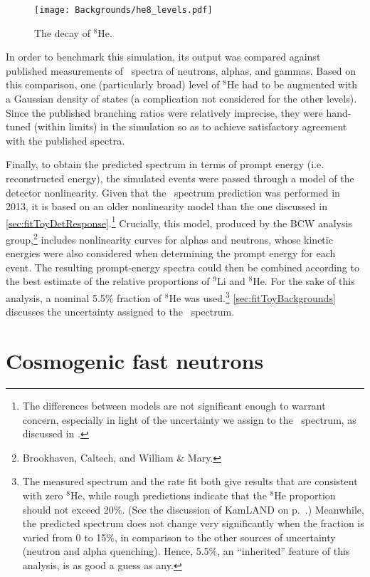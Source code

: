 \documentclass[../thesis.tex]{subfiles}
\begin{document}
\begin{figure}[h]
  \texttt{[image: Backgrounds/he8\_levels.pdf]}
  \caption{The decay of $^8$He.}
  \label{fig:he8_levels}
\end{figure}

In order to benchmark this simulation, its output was compared against published measurements of \LiHe\ spectra of neutrons, alphas, and gammas. Based on this comparison, one (particularly broad) level of $^8$He had to be augmented with a Gaussian density of states (a complication not considered for the other levels). Since the published branching ratios were relatively imprecise, they were hand-tuned (within limits) in the simulation so as to achieve satisfactory agreement with the published spectra.

Finally, to obtain the predicted spectrum in terms of prompt energy (i.e. reconstructed energy), the simulated events were passed through a model of the detector nonlinearity. Given that the \LiHe\ spectrum prediction was performed in 2013, it is based on an older nonlinearity model than the one discussed in \autoref{sec:fitToyDetResponse}.\footnote{The differences between models are not significant enough to warrant concern, especially in light of the uncertainty we assign to the \LiHe\ spectrum, as discussed in \cite{berkeley_toymc}.} Crucially, this model, produced by the BCW analysis group,\footnote{Brookhaven, Caltech, and William \& Mary.} includes nonlinearity curves for alphas and neutrons, whose kinetic energies were also considered when determining the prompt energy for each event. The resulting prompt-energy spectra could then be combined according to the best estimate of the relative proportions of $^9$Li and $^8$He. For the sake of this analysis, a nominal 5.5\% fraction of $^8$He was used.\footnote{The measured spectrum and the rate fit both give results that are consistent with zero $^8$He, while rough predictions indicate that the $^8$He proportion should not exceed 20\%. (See the discussion of KamLAND on p.~\pageref{par:kamland_he8}.) Meanwhile, the predicted spectrum does not change very significantly when the fraction is varied from 0 to 15\%, in comparison to the other sources of uncertainty (neutron and alpha quenching). Hence, 5.5\%, an ``inherited'' feature of this analysis, is as good a guess as any.} \autoref{sec:fitToyBackgrounds} discusses the uncertainty assigned to the \LiHe\ spectrum.

\section{Cosmogenic fast neutrons}
\label{sec:bkgFastn}
\end{document}
